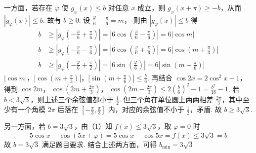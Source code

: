 \begin{solution}
\begin{enumerate}
一方面，若存在 \(\varphi\) 使 \(g_\varphi(x)\le b\) 对任意 \(x\) 成立，则 \(g_\varphi(x+\pi)\ge -b\)，从而
\(|g_\varphi(x)|\le b\).
故有 \(b\ge 0\). 设
\(\frac{\varphi}{6}-\frac{\pi}{6}=m\)，
则由 \(|g_\varphi(x)|\le b\) 得
\begin{align*}
b&\ge \left|g_\varphi\left(-\frac{\varphi}{6}+\frac{\pi}{6}\right)\right| =\left|6\cos\left(\frac{\varphi}{6}-\frac{\pi}{6}\right)\right| =6|\cos m|\\
b&\ge \left|g_\varphi\left(-\frac{\varphi}{6}-\frac{\pi}{6}\right)\right| =\left|6\cos\left(\frac{\varphi}{6}+\frac{\pi}{6}\right)\right| =6\left|\cos\left(m+\frac{\pi}{3}\right)\right|\\
b&\ge \left|g_\varphi\left(-\frac{\varphi}{6}+\frac{\pi}{2}\right)\right| =\left|6\sin\left(\frac{\varphi}{6}\right)\right| =6\left|\sin\left(m+\frac{\pi}{6}\right)\right|
\end{align*}
\(|\cos m|\)，\(\left|\cos\left(m+\frac{\pi}{3}\right)\right|\)，\(\left|\sin\left(m+\frac{\pi}{6}\right)\right|\le \frac{b}{6}\).
再结合 \(\cos 2x = 2\cos^2 x - 1\)，得到
\(\cos 2m\)，\(\ \cos \left(2m+\frac{2\pi}{3}\right)\)，\(\ \cos \left(2m-\frac{2\pi}{3}\right)\le 2\left(\frac{b}{6}\right)^2-1=\frac{b^2}{18}-1\).
若 \(b<3\sqrt{3}\)，则上述三个余弦值都小于 \(\frac{1}{2}\). 但三个角在单位圆上两两相差 \(\frac{2\pi}{3}\)，其中至少有一个角模 \(2\pi\) 后落在 \(\left[-\frac{\pi}{3},\frac{\pi}{3}\right]\) 内，对应的余弦值不小于 \(\frac{1}{2}\)，矛盾. 故 \(b\ge 3\sqrt{3}\).

另一方面，若 \(b=3\sqrt{3}\)，由（1）知 \(f(x)\le 3\sqrt{3}\)，取 \(\varphi=0\) 时
\[
5\cos x-\cos (5x+\varphi)=5\cos x-\cos 5x=f(x)\le 3\sqrt{3}=b
\]
故 \(b=3\sqrt{3}\) 满足题目要求. 结合上述两方面，可得
\(
b_{\min}=3\sqrt{3}
\)
\end{enumerate}
\end{solution}
